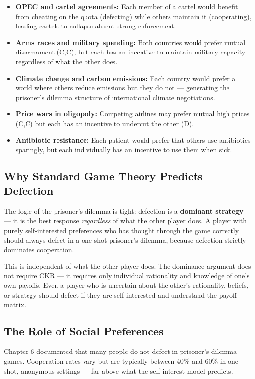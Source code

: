 \documentclass[12pt, letterpaper]{article}
\begin{document}
\begin{itemize}
\item \textbf{OPEC and cartel agreements:} Each member of a cartel would benefit from cheating on the quota (defecting) while others maintain it (cooperating), leading cartels to collapse absent strong enforcement.
\item \textbf{Arms races and military spending:} Both countries would prefer mutual disarmament (C,C), but each has an incentive to maintain military capacity regardless of what the other does.
\item \textbf{Climate change and carbon emissions:} Each country would prefer a world where others reduce emissions but they do not --- generating the prisoner's dilemma structure of international climate negotiations.
\item \textbf{Price wars in oligopoly:} Competing airlines may prefer mutual high prices (C,C) but each has an incentive to undercut the other (D).
\item \textbf{Antibiotic resistance:} Each patient would prefer that others use antibiotics sparingly, but each individually has an incentive to use them when sick.
\end{itemize}


\subsection{Why Standard Game Theory Predicts Defection}


The logic of the prisoner's dilemma is tight: defection is a \textbf{dominant strategy} --- it is the best response \textit{regardless} of what the other player does. A player with purely self-interested preferences who has thought through the game correctly should always defect in a one-shot prisoner's dilemma, because defection strictly dominates cooperation.

This is independent of what the other player does. The dominance argument does not require CKR --- it requires only individual rationality and knowledge of one's own payoffs. Even a player who is uncertain about the other's rationality, beliefs, or strategy should defect if they are self-interested and understand the payoff matrix.


\subsection{The Role of Social Preferences}


Chapter 6 documented that many people do not defect in prisoner's dilemma games. Cooperation rates vary but are typically between 40\% and 60\% in one-shot, anonymous settings --- far above what the self-interest model predicts.
\end{document}
